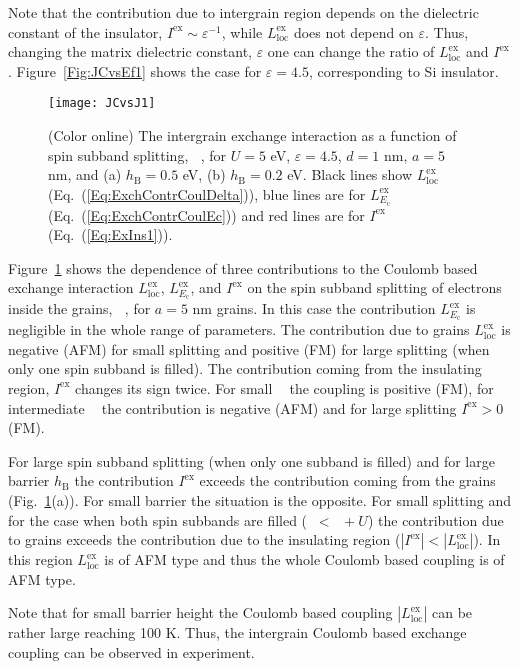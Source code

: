 \documentclass[aps,prb,amsmath,amssymb,twocolumn,superscriptaddress,showpacs,floatfix]{revtex4-1}
\DeclareMathOperator{\Ji}{\mathit J_{\mathrm{sd}}}
\DeclareMathOperator{\Ef}{E_\mathrm F}
\begin{document}
Note that the contribution due to intergrain region
depends on the dielectric constant of the insulator,
$I^\mathrm{ex}\sim \varepsilon^{-1}$, while $L_\mathrm{loc}^\mathrm{ex}$ does not depend
on $\varepsilon$. Thus, changing the matrix dielectric constant, $\varepsilon$ one can
change the ratio of $L_\mathrm{loc}^\mathrm{ex}$ and $I^\mathrm{ex}$.
Figure~\ref{Fig:JCvsEf1} shows the case for $\varepsilon=4.5$, corresponding to Si insulator.
\begin{figure}
\texttt{[image: JCvsJ1]}
\caption{(Color online) The intergrain exchange interaction as a function of
spin subband splitting, $\Ji$, for $U=5$ eV, $\varepsilon=4.5$, $d=1$ nm, $a=5$ nm,
and (a) $h_\mathrm B=0.5$ eV, (b) $h_\mathrm B=0.2$ eV.
Black lines show $L^\mathrm{ex}_\mathrm{loc}$ (Eq.~(\ref{Eq:ExchContrCoulDelta})),
blue lines are for $L^\mathrm{ex}_{E_\mathrm c}$ (Eq.~(\ref{Eq:ExchContrCoulEc}))
and red lines are for $I^\mathrm{ex}$ (Eq.~(\ref{Eq:ExIns1})).} \label{Fig:JCvsJ1}
\end{figure}

Figure~\ref{Fig:JCvsJ1} shows the dependence of three contributions
to the Coulomb based exchange interaction $L^\mathrm{ex}_\mathrm{loc}$, $L^\mathrm{ex}_{E_\mathrm c}$,
and $I^\mathrm{ex}$ on the spin subband splitting of electrons inside the grains, $\Ji$, for
$a=5$ nm grains. In this case the contribution $L^\mathrm{ex}_{E_\mathrm c}$ is negligible
in the whole range of parameters. The contribution due to
grains $L^\mathrm{ex}_\mathrm{loc}$ is negative (AFM) for
small splitting and positive (FM) for large splitting
(when only one spin subband is filled). The contribution coming from
the insulating region, $I^\mathrm{ex}$ changes its sign twice.
For small $\Ji$ the coupling is positive (FM), for intermediate $\Ji$ the contribution
is negative (AFM) and for large splitting $I^\mathrm{ex}>0$ (FM).

For large spin subband splitting (when only one subband is filled) and
for large barrier $h_\mathrm B$ the contribution $I^\mathrm{ex}$
exceeds the contribution coming from the grains
(Fig.~\ref{Fig:JCvsJ1}(a)). For small barrier the situation is the opposite.
For small splitting and for the case when both spin subbands
are filled ($\Ji<\Ef+U$) the contribution due to grains
exceeds the contribution due to the insulating
region ($|I^\mathrm{ex}|<|L^\mathrm{ex}_\mathrm{loc}|$).
In this region $L^\mathrm{ex}_\mathrm{loc}$ is of AFM type
and thus the whole Coulomb based coupling is of AFM type.

Note that for small barrier height
the Coulomb based coupling $|L^\mathrm{ex}_\mathrm{loc}|$ can be rather
large reaching 100 K. Thus, the intergrain Coulomb based exchange coupling
can be observed in experiment.
\end{document}
